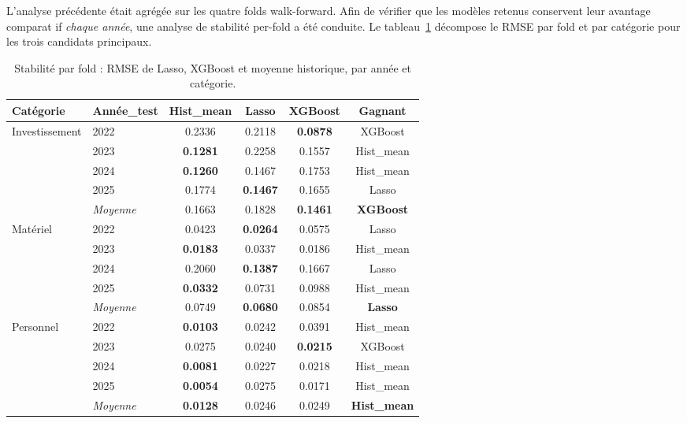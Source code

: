 L'analyse pr\'ec\'edente \'etait agr\'eg\'ee sur les quatre folds walk-forward.
Afin de v\'erifier que les mod\`eles retenus conservent leur avantage comparat if
\emph{chaque ann\'ee}, une analyse de stabilit\'e per-fold a \'et\'e conduite.
Le tableau~\ref{tab:stability} d\'ecompose le RMSE par fold et par cat\'egorie pour
les trois candidats principaux.

\begin{table}[H]
\centering\small
\caption{Stabilit\'e par fold : RMSE de Lasso, XGBoost et moyenne historique, par ann\'ee et cat\'egorie.}
\label{tab:stability}
\begin{tabular}{@{}llcccc@{}}
\toprule
\textbf{Cat\'egorie} & \textbf{Ann\'ee\_test} & \textbf{Hist\_mean} & \textbf{Lasso} & \textbf{XGBoost} & \textbf{Gagnant} \\
\midrule
\multirow{4}{*}{Investissement} 
    & 2022 & 0.2336 & 0.2118 & \textbf{0.0878} & XGBoost \\
    & 2023 & \textbf{0.1281} & 0.2258 & 0.1557 & Hist\_mean \\
    & 2024 & \textbf{0.1260} & 0.1467 & 0.1753 & Hist\_mean \\
    & 2025 & 0.1774 & \textbf{0.1467} & 0.1655 & Lasso \\
    & \textit{Moyenne} & 0.1663 & 0.1828 & \textbf{0.1461} & \textbf{XGBoost} \\
\midrule
\multirow{4}{*}{Mat\'eriel}
    & 2022 & 0.0423 & \textbf{0.0264} & 0.0575 & Lasso \\
    & 2023 & \textbf{0.0183} & 0.0337 & 0.0186 & Hist\_mean \\
    & 2024 & 0.2060 & \textbf{0.1387} & 0.1667 & Lasso \\
    & 2025 & \textbf{0.0332} & 0.0731 & 0.0988 & Hist\_mean \\
    & \textit{Moyenne} & 0.0749 & \textbf{0.0680} & 0.0854 & \textbf{Lasso} \\
\midrule
\multirow{4}{*}{Personnel}
    & 2022 & \textbf{0.0103} & 0.0242 & 0.0391 & Hist\_mean \\
    & 2023 & 0.0275 & 0.0240 & \textbf{0.0215} & XGBoost \\
    & 2024 & \textbf{0.0081} & 0.0227 & 0.0218 & Hist\_mean \\
    & 2025 & \textbf{0.0054} & 0.0275 & 0.0171 & Hist\_mean \\
    & \textit{Moyenne} & \textbf{0.0128} & 0.0246 & 0.0249 & \textbf{Hist\_mean} \\
\bottomrule
\end{tabular}
\end{table}

